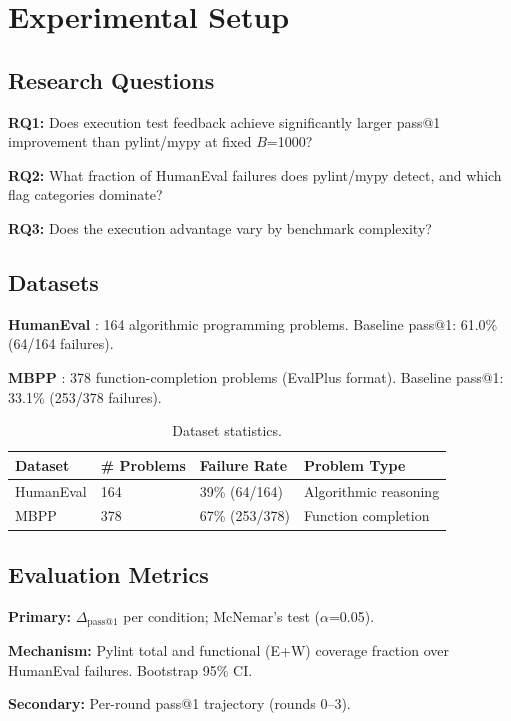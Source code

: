 \section{Experimental Setup}
\label{sec:setup}

\subsection{Research Questions}

\textbf{RQ1:} Does execution test feedback achieve significantly larger pass@1 improvement than pylint/mypy at fixed $B$=1000?

\textbf{RQ2:} What fraction of HumanEval failures does pylint/mypy detect, and which flag categories dominate?

\textbf{RQ3:} Does the execution advantage vary by benchmark complexity?

\subsection{Datasets}

\textbf{HumanEval} \cite{Chen2021Evaluating}: 164 algorithmic programming problems. Baseline pass@1: 61.0\% (64/164 failures).

\textbf{MBPP} \cite{Austin2021Program}: 378 function-completion problems (EvalPlus format). Baseline pass@1: 33.1\% (253/378 failures).

\begin{table}[h]
\centering
\caption{Dataset statistics.}
\label{tab:datasets}
\begin{tabular}{llll}
\toprule
\textbf{Dataset} & \textbf{\# Problems} & \textbf{Failure Rate} & \textbf{Problem Type} \\
\midrule
HumanEval & 164 & 39\% (64/164) & Algorithmic reasoning \\
MBPP & 378 & 67\% (253/378) & Function completion \\
\bottomrule
\end{tabular}
\end{table}

\subsection{Evaluation Metrics}

\textbf{Primary:} $\Delta_{\text{pass@1}}$ per condition; McNemar's test ($\alpha$=0.05).

\textbf{Mechanism:} Pylint total and functional (E+W) coverage fraction over HumanEval failures. Bootstrap 95\% CI.

\textbf{Secondary:} Per-round pass@1 trajectory (rounds 0--3).
